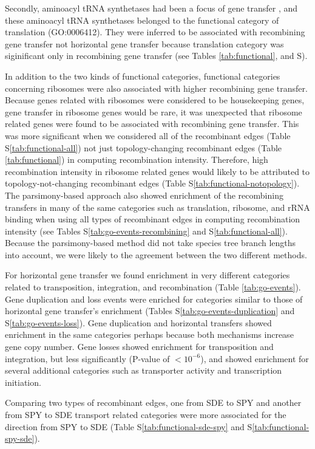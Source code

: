 \documentclass[english]{article}
\begin{document}
Secondly, aminoacyl tRNA synthetases had been a focus of gene transfer
\citep{Woese2000}, and these aminoacyl tRNA synthetases belonged to the
functional category of translation (GO:0006412).  They were inferred to be 
associated with recombining gene transfer not horizontal gene transfer because
translation category was siginificant only in recombining gene transfer (see
Tables \ref{tab:functional}, \label{tab:go-events} and S\label{tab:go-events-recombining}).  

In addition to the two kinds of functional categories, functional categories
concerning ribosomes were also associated with higher recombining gene transfer.
Because genes related with ribosomes were considered to be housekeeping genes,
gene transfer in ribosome genes would be rare, it was unexpected that ribosome
related genes were found to be associated with recombining gene transfer. This
was more significant when we considered all of the recombinant edges (Table
S\ref{tab:functional-all}) not just topology-changing recombinant edges (Table
\ref{tab:functional}) in computing recombination intensity.  Therefore, high
recombination intensity in ribosome related genes would likely to be attributed
to topology-not-changing recombinant edges (Table
S\ref{tab:functional-notopology}).  The parsimony-based approach also showed
enrichment of the recombining transfers in many of the same categories such as
translation, ribosome, and rRNA binding when using all types of recombinant
edges in computing recombination intensity (see Tables
S\ref{tab:go-events-recombining} and S\ref{tab:functional-all}).  Because the
parsimony-based method did not take species tree branch lengths into account, we
were likely to the agreement between the two different methods. 

For horizontal gene transfer we found enrichment in very different categories
related to transposition, integration, and recombination (Table
\ref{tab:go-events}).  Gene duplication and loss events were enriched for
categories similar to those of horizontal gene transfer's enrichment (Tables
S\ref{tab:go-events-duplication} and S\ref{tab:go-events-loss}).
Gene duplication and horizontal transfers showed enrichment in the same
categories perhaps because both mechanisms increase gene copy number.  
Gene losses showed enrichment for transposition and integration, but less
significantly (P-value of $<10^{-6}$), and showed enrichment for several
additional categories such as transporter activity and transcription initiation.

Comparing two types of recombinant edges, one from SDE to SPY and another from
SPY to SDE transport related categories were more associated for the direction
from SPY to SDE
(Table S\ref{tab:functional-sde-spy} and S\ref{tab:functional-spy-sde}).
\end{document}
